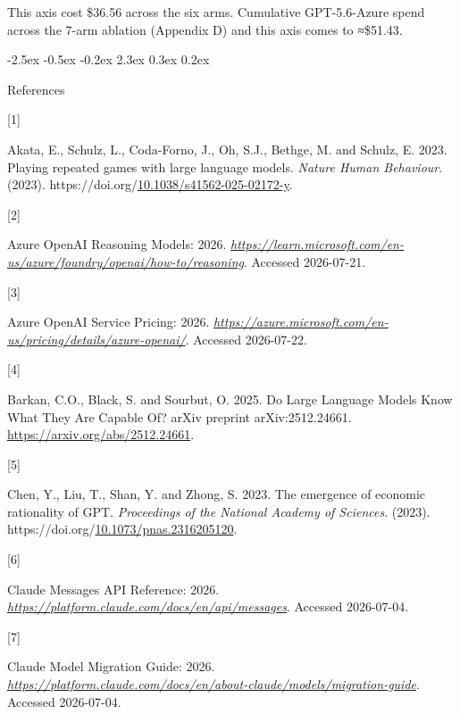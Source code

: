 \documentclass[
  11pt,
]{article}
\makeatletter
\newlength{\cslhangindent}
\newlength{\csllabelwidth}
\newenvironment{CSLReferences}[2] %
 {\begin{list}{}{%
  \setlength{\itemindent}{0pt}
  \setlength{\leftmargin}{0pt}
  \setlength{\parsep}{0pt}
  \ifodd #1
   \setlength{\leftmargin}{\cslhangindent}
   \setlength{\itemindent}{-1\cslhangindent}
  \fi
  \setlength{\itemsep}{#2\baselineskip}}}
 {\end{list}}
\newcommand{\CSLLeftMargin}[1]{\parbox[t]{\csllabelwidth}{\strut#1\strut}}
\newcommand{\CSLRightInline}[1]{\parbox[t]{\linewidth - \csllabelwidth}{\strut#1\strut}}
\renewcommand{\section}{%
  \@startsection{section}{1}{\z@}%
                {-2.5ex \@plus -0.5ex \@minus -0.2ex}%
                { 2.3ex \@plus  0.3ex \@minus  0.2ex}%
                {\large\bf\raggedright}%
}
\makeatother
\begin{document}
This axis cost \$36.56 across the six arms. Cumulative GPT-5.6-Azure spend across the 7-arm ablation (Appendix D) and this axis comes to ≈\$51.43.

\section{References}\label{references}

\protect{}\label{refs}
\begin{CSLReferences}{0}{0}
\CSLLeftMargin{{[}1{]} }%
\CSLRightInline{Akata, E., Schulz, L., Coda-Forno, J., Oh, S.J., Bethge, M. and Schulz, E. 2023. {Playing repeated games with large language models}. \emph{Nature Human Behaviour}. (2023). https://doi.org/\href{https://doi.org/10.1038/s41562-025-02172-y}{10.1038/s41562-025-02172-y}.}

\CSLLeftMargin{{[}2{]} }%
\CSLRightInline{{Azure OpenAI Reasoning Models}: 2026. \href{https://learn.microsoft.com/en-us/azure/foundry/openai/how-to/reasoning}{\emph{https://learn.microsoft.com/en-us/azure/foundry/openai/how-to/reasoning}}. Accessed 2026-07-21.}

\CSLLeftMargin{{[}3{]} }%
\CSLRightInline{{Azure OpenAI Service Pricing}: 2026. \href{https://azure.microsoft.com/en-us/pricing/details/azure-openai/}{\emph{https://azure.microsoft.com/en-us/pricing/details/azure-openai/}}. Accessed 2026-07-22.}

\CSLLeftMargin{{[}4{]} }%
\CSLRightInline{Barkan, C.O., Black, S. and Sourbut, O. 2025. {Do Large Language Models Know What They Are Capable Of?} arXiv preprint arXiv:2512.24661. \url{https://arxiv.org/abs/2512.24661}.}

\CSLLeftMargin{{[}5{]} }%
\CSLRightInline{Chen, Y., Liu, T., Shan, Y. and Zhong, S. 2023. {The emergence of economic rationality of GPT}. \emph{Proceedings of the National Academy of Sciences}. (2023). https://doi.org/\href{https://doi.org/10.1073/pnas.2316205120}{10.1073/pnas.2316205120}.}

\CSLLeftMargin{{[}6{]} }%
\CSLRightInline{{Claude Messages API Reference}: 2026. \href{https://platform.claude.com/docs/en/api/messages}{\emph{https://platform.claude.com/docs/en/api/messages}}. Accessed 2026-07-04.}

\CSLLeftMargin{{[}7{]} }%
\CSLRightInline{{Claude Model Migration Guide}: 2026. \href{https://platform.claude.com/docs/en/about-claude/models/migration-guide}{\emph{https://platform.claude.com/docs/en/about-claude/models/migration-guide}}. Accessed 2026-07-04.}


\end{CSLReferences}
\end{document}

